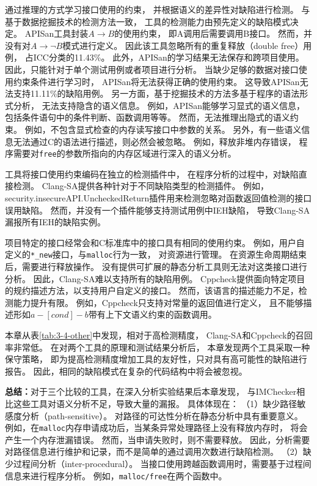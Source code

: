 {} 通过推理的方式学习接口使用的约束，
并根据语义的差异性对缺陷进行检测。
与基于数据挖掘技术的检测方法一致，
工具的检测能力由预先定义的缺陷模式决定。
APISan工具封装$A \rightarrow B$的使用约束，
即A调用后需要调用B接口。
然而，并没有对$A \rightarrow \neg B$模式进行定义。
因此该工具忽略所有的重复释放（double free）用例，
占ICC分类的11.43\%。
此外，APISan的学习结果无法保存和跨项目使用。
因此，只能针对于单个测试用例或者项目进行分析。
当缺少足够的数据对接口使用约束条件进行学习时，
APISan将无法获得正确的使用约束。
这导致APISan无法支持11.11\%的缺陷用例。
另一方面，基于挖掘技术的方法多基于程序的语法形式分析，
无法支持隐含的语义信息。
例如，APISan能够学习显式的语义信息，包括条件语句中的条件判断、函数调用等等。
然而，无法推理出隐式的语义约束。
例如，不包含显式检查的内存读写接口中参数的关系。
另外，有一些语义信息无法通过C的语法进行描述，则必然会被忽略。
例如，释放非堆内存错误，
程序需要对\texttt{free}的参数所指向的内存区域进行深入的语义分析。

{}工具将接口使用约束编码在独立的检测插件中，
在程序分析的过程中，对缺陷直接检测。
Clang-SA提供各种针对于不同缺陷类型的检测插件。
例如，security.insecureAPI.UncheckedReturn插件用来检测忽略对函数返回值检测的接口误用缺陷。
然而，并没有一个插件能够支持测试用例中IEH缺陷，
导致Clang-SA漏报所有IEH的缺陷实例。

项目特定的接口经常会和C标准库中的接口具有相同的使用约束。
例如，用户自定义的\texttt{*\_new}接口，与\texttt{malloc}行为一致，
对资源进行管理。
在资源生命周期结束后，需要进行释放操作。
没有提供可扩展的静态分析工具则无法对这类接口进行分析。
因此，Clang-SA难以支持所有的缺陷用例。
Cppcheck提供面向特定项目的规约描述方法，以支持用户自定义的接口。
然而，该语言的描述能力不足，检测能力提升有限。
例如，Cppcheck只支持对常量的返回值进行定义，
且不能够描述形如$a - [cond] - b$带有上下文语义约束的函数调用。

本章从表\ref{tab:3-4-other}中发现，相对于高检测精度，
Clang-SA和Cppcheck的召回率非常低。
在对两个工具的原理和测试结果分析后，
本章发现两个工具采取一种保守策略，
即为提高检测精度增加工具的友好性，只对具有高可能性的缺陷进行报告。
因此，相同的缺陷模式在复杂的代码结构中将会被忽视。

\noindent\textbf{总结：}对于三个比较的工具，在深入分析实验结果后本章发现，
与IMChecker相比这些工具对语义分析不足，导致大量的漏报。
具体体现在：
（1）缺少路径敏感度分析（path-sensitive）。
对路径的可达性分析在静态分析中具有重要意义。
例如，在\texttt{malloc}内存申请成功后，当某条异常处理路径上没有释放内存时，
将会产生一个内存泄漏错误。
然而，当申请失败时，则不需要释放。
因此，分析需要对路径信息进行维护和记录，而不是简单的通过调用次数进行缺陷检测。
（2）缺少过程间分析（inter-procedural）。
当接口使用跨越函数调用时，需要基于过程间信息来进行程序分析。
例如，\texttt{malloc/free}在两个函数中。


